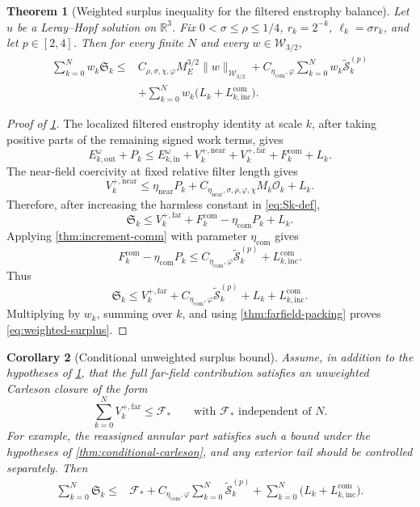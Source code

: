 \documentclass[11pt]{article}
\numberwithin{equation}{section}
\theoremstyle{plain}
\newtheorem{theorem}{Theorem}[section]
\newtheorem{corollary}[theorem]{Corollary}
\theoremstyle{definition}
\theoremstyle{remark}
\newcommand{\R}{\mathbb R}
\begin{document}
\begin{theorem}[Weighted surplus inequality for the filtered enstrophy balance]\label{thm:weighted-surplus}
Let $u$ be a Leray--Hopf solution on $\R^3$.  Fix $0<\sigma\le\rho\le1/4$, $r_k=2^{-k}$, $\ell_k=\sigma r_k$, and let $p\in[2,4]$.  Then for every finite $N$ and every $w\in\mathcal W_{3/2}$,
\begin{align}
\sum_{k=0}^{N}w_k\mathfrak S_k
\le{}&
C_{\rho,\sigma,\chi,\varphi}M_E^{3/2}
\|w\|_{\mathcal W_{3/2}}
+
C_{\eta_{\mathrm{com}},\varphi}\sum_{k=0}^{N}w_k\widetilde{\mathcal S}_k^{(p)}
\nonumber\\
&+
\sum_{k=0}^{N}w_k\bigl(L_k+L_{k,\mathrm{inc}}^{\mathrm{com}}\bigr).
\label{eq:weighted-surplus}
\end{align}
\end{theorem}

\begin{proof}[Proof of \cref{thm:weighted-surplus}]
The localized filtered enstrophy identity at scale $k$, after taking positive parts of the remaining signed work terms, gives
\[
E_{k,\mathrm{out}}^\omega+P_k
\le
E_{k,\mathrm{in}}^\omega
+V_k^{+,\mathrm{near}}
+V_k^{+,\mathrm{far}}
+F_k^{\mathrm{com}}
+L_k.
\]
The near-field coercivity at fixed relative filter length gives
\[
V_k^{+,\mathrm{near}}
\le
\eta_{\mathrm{near}}P_k
+C_{\eta_{\mathrm{near}},\sigma,\rho,\varphi,\chi}M_k\mathcal O_k
+L_k.
\]
Therefore, after increasing the harmless constant in \eqref{eq:Sk-def},
\[
\mathfrak S_k
\le
V_k^{+,\mathrm{far}}
+F_k^{\mathrm{com}}
-\eta_{\mathrm{com}}P_k
+L_k.
\]
Applying \cref{thm:increment-comm} with parameter $\eta_{\mathrm{com}}$ gives
\[
F_k^{\mathrm{com}}-\eta_{\mathrm{com}}P_k
\le
C_{\eta_{\mathrm{com}},\varphi}\widetilde{\mathcal S}_k^{(p)}
+L_{k,\mathrm{inc}}^{\mathrm{com}}.
\]
Thus
\[
\mathfrak S_k
\le
V_k^{+,\mathrm{far}}
+C_{\eta_{\mathrm{com}},\varphi}\widetilde{\mathcal S}_k^{(p)}
+L_k+L_{k,\mathrm{inc}}^{\mathrm{com}}.
\]
Multiplying by $w_k$, summing over $k$, and using \cref{thm:farfield-packing} proves \eqref{eq:weighted-surplus}.
\end{proof}

\begin{corollary}[Conditional unweighted surplus bound]\label{cor:conditional-unweighted-surplus}
Assume, in addition to the hypotheses of \cref{thm:weighted-surplus}, that the full far-field contribution satisfies an unweighted Carleson closure of the form
\[
\sum_{k=0}^{N}V_k^{+,\mathrm{far}}
\le
\mathcal F_*
\qquad\text{with }\mathcal F_*\text{ independent of }N.
\]
For example, the reassigned annular part satisfies such a bound under the hypotheses of \cref{thm:conditional-carleson}, and any exterior tail should be controlled separately.  Then
\begin{align*}
\sum_{k=0}^{N}\mathfrak S_k
\le{}&
\mathcal F_*
+C_{\eta_{\mathrm{com}},\varphi}\sum_{k=0}^{N}\widetilde{\mathcal S}_k^{(p)}
+\sum_{k=0}^{N}\bigl(L_k+L_{k,\mathrm{inc}}^{\mathrm{com}}\bigr).
\end{align*}
\end{corollary}
\end{document}

